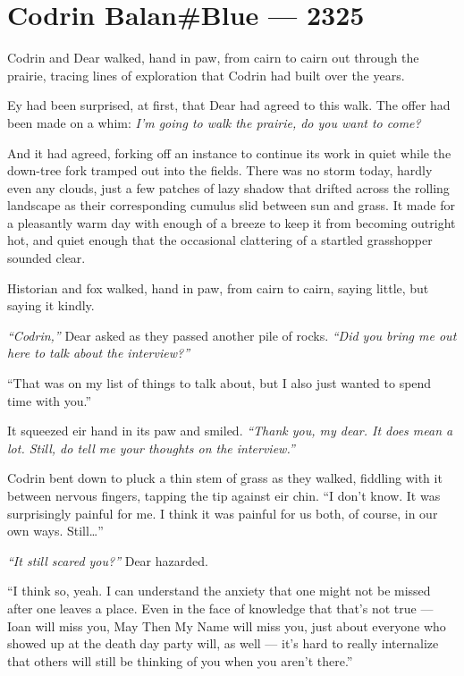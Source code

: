 \hypertarget{codrin-balanblue-2325}{%
\chapter{Codrin Balan\#Blue — 2325}\label{codrin-balanblue-2325}}

Codrin and Dear walked, hand in paw, from cairn to cairn out through the prairie, tracing lines of exploration that Codrin had built over the years.

Ey had been surprised, at first, that Dear had agreed to this walk. The offer had been made on a whim: \emph{I'm going to walk the prairie, do you want to come?}

And it had agreed, forking off an instance to continue its work in quiet while the down-tree fork tramped out into the fields. There was no storm today, hardly even any clouds, just a few patches of lazy shadow that drifted across the rolling landscape as their corresponding cumulus slid between sun and grass. It made for a pleasantly warm day with enough of a breeze to keep it from becoming outright hot, and quiet enough that the occasional clattering of a startled grasshopper sounded clear.

Historian and fox walked, hand in paw, from cairn to cairn, saying little, but saying it kindly.

\emph{``Codrin,''} Dear asked as they passed another pile of rocks. \emph{``Did you bring me out here to talk about the interview?''}

``That was on my list of things to talk about, but I also just wanted to spend time with you.''

It squeezed eir hand in its paw and smiled. \emph{``Thank you, my dear. It does mean a lot. Still, do tell me your thoughts on the interview.''}

Codrin bent down to pluck a thin stem of grass as they walked, fiddling with it between nervous fingers, tapping the tip against eir chin. ``I don't know. It was surprisingly painful for me. I think it was painful for us both, of course, in our own ways. Still\ldots{}''

\emph{``It still scared you?''} Dear hazarded.

``I think so, yeah. I can understand the anxiety that one might not be missed after one leaves a place. Even in the face of knowledge that that's not true — Ioan will miss you, May Then My Name will miss you, just about everyone who showed up at the death day party will, as well — it's hard to really internalize that others will still be thinking of you when you aren't there.''

